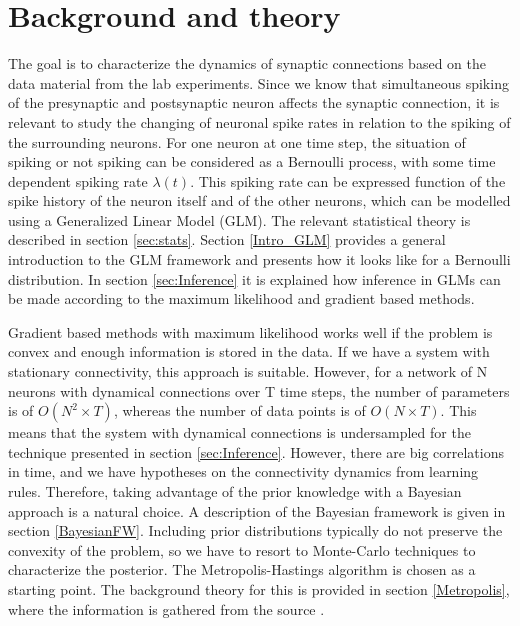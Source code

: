 
\chapter{Background and theory}
\label{ch:theory}

The goal is to characterize the dynamics of synaptic connections based on the data material from the lab experiments. Since we know that simultaneous spiking of the presynaptic and postsynaptic neuron affects the synaptic connection, it is relevant to study the changing of neuronal spike rates in relation to the spiking of the surrounding neurons. For one neuron at one time step, the situation of spiking or not spiking can be considered as a Bernoulli process, with some time dependent spiking rate $\lambda (t)$. This spiking rate can be expressed function of the spike history of the neuron itself and of the other neurons, which can be modelled using a Generalized Linear Model (GLM). The relevant statistical theory is described in section \ref{sec:stats}. Section \ref{Intro_GLM} provides a general introduction to the GLM framework and presents how it looks like for a Bernoulli distribution. In section \ref{sec:Inference} it is explained how inference in GLMs can be made according to the maximum likelihood and gradient based methods. 

Gradient based methods with maximum likelihood works well if the problem is convex and enough information is stored in the data. If we have a system with stationary connectivity, this approach is suitable. However, for a network of N neurons with dynamical connections over T time steps, the number of parameters is of $O(N^2 \times T)$, whereas the number of data points is of $O(N \times T)$. This means that the system with dynamical connections is undersampled for the technique presented in section \ref{sec:Inference}. However, there are big correlations in time, and we have hypotheses on the connectivity dynamics from learning rules. Therefore, taking advantage of the prior knowledge with a Bayesian approach is a natural choice. A description of the Bayesian framework is given in section \ref{BayesianFW}. Including prior distributions typically do not preserve the convexity of the problem, so we have to resort to Monte-Carlo techniques to characterize the posterior. The Metropolis-Hastings algorithm is chosen as a starting point. The background theory for this is provided in section \ref{Metropolis}, where the information is gathered from the source \cite{MC}.

